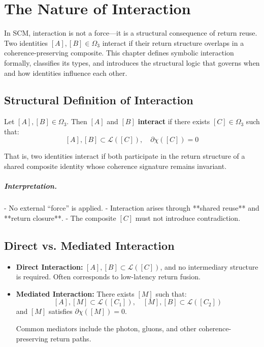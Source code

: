 \chapter{The Nature of Interaction} \label{chapter-interaction}

In SCM, interaction is not a force—it is a structural consequence of return reuse. Two identities \([A], [B] \in \Omega_3\) interact if their return structure overlaps in a coherence-preserving composite. This chapter defines symbolic interaction formally, classifies its types, and introduces the structural logic that governs when and how identities influence each other.

\section{Structural Definition of Interaction} \label{sec:interaction-definition}

\begin{definition}
Let $[A], [B] \in \Omega_3$. Then $[A]$ and $[B]$ \textbf{interact} if there exists $[C] \in \Omega_3$ such that:
\[
[A], [B] \subset \mathcal{L}([C]), \quad \partial\chi([C]) = 0
\]
\end{definition}

That is, two identities interact if both participate in the return structure of a shared composite identity whose coherence signature remains invariant.

\paragraph{Interpretation.}
- No external “force” is applied.
- Interaction arises through **shared reuse** and **return closure**.
- The composite $[C]$ must not introduce contradiction.

\section{Direct vs. Mediated Interaction} \label{sec:interaction-types}

\begin{itemize}
    \item \textbf{Direct Interaction:}  
    \([A], [B] \subset \mathcal{L}([C])\), and no intermediary structure is required.  
    Often corresponds to low-latency return fusion.
    
    \item \textbf{Mediated Interaction:}  
    There exists $[M]$ such that:
    \[
    [A], [M] \subset \mathcal{L}([C_1]),\quad [M], [B] \subset \mathcal{L}([C_2])
    \]
    and $[M]$ satisfies $\partial\chi([M]) = 0$.
    
    Common mediators include the photon, gluons, and other coherence-preserving return paths.
\end{itemize}

